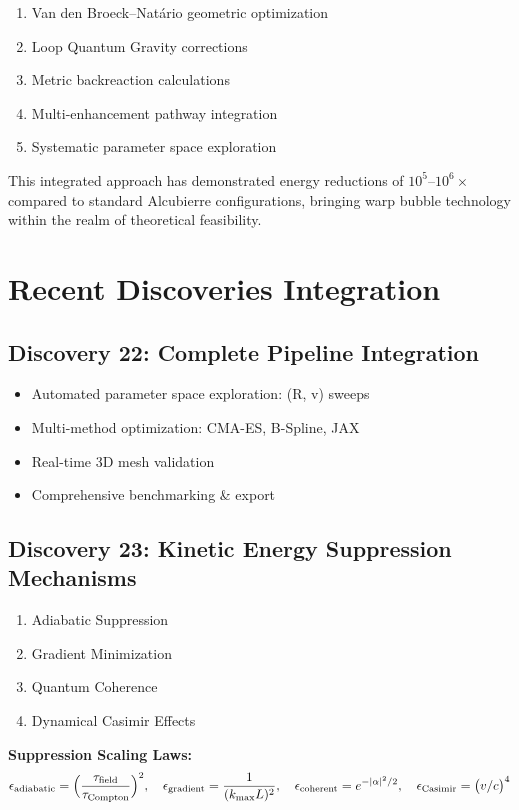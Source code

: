 \documentclass{article}
\begin{document}
\begin{enumerate}
\item Van den Broeck–Natário geometric optimization
\item Loop Quantum Gravity corrections
\item Metric backreaction calculations
\item Multi-enhancement pathway integration
\item Systematic parameter space exploration
\end{enumerate}

This integrated approach has demonstrated energy reductions of $10^5$--$10^6\times$ compared to standard Alcubierre configurations, bringing warp bubble technology within the realm of theoretical feasibility.

\section{Recent Discoveries Integration}

\subsection{Discovery 22: Complete Pipeline Integration}
\begin{itemize}
  \item Automated parameter space exploration: (R, v) sweeps
  \item Multi-method optimization: CMA-ES, B-Spline, JAX
  \item Real-time 3D mesh validation
  \item Comprehensive benchmarking \& export
\end{itemize}

\subsection{Discovery 23: Kinetic Energy Suppression Mechanisms}
\begin{enumerate}
  \item Adiabatic Suppression
  \item Gradient Minimization
  \item Quantum Coherence
  \item Dynamical Casimir Effects
\end{enumerate}

\textbf{Suppression Scaling Laws:}
\[
  \epsilon_{\rm adiabatic} = \Bigl(\frac{\tau_{\rm field}}{\tau_{\rm Compton}}\Bigr)^2,\quad
  \epsilon_{\rm gradient} = \frac{1}{(k_{\max}L)^2},\quad
  \epsilon_{\rm coherent} = e^{-|\alpha|^2/2},\quad
  \epsilon_{\rm Casimir} = \bigl(v/c\bigr)^4
\]
\end{document}
